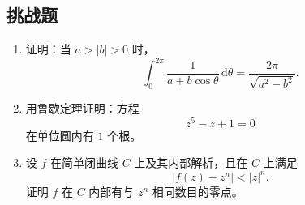 \subsection*{挑战题}

\begin{enumerate}
    \item 证明：当 $a>|b|>0$ 时，
    \[
        \int_0^{2\pi}\frac{1}{a+b\cos\theta}\,\mathrm{d}\theta
        =
        \frac{2\pi}{\sqrt{a^2-b^2}}.
    \]

    \item 用鲁歇定理证明：方程
    \[
        z^5-z+1=0
    \]
    在单位圆内有 $1$ 个根。

    \item 设 $f$ 在简单闭曲线 $C$ 上及其内部解析，且在 $C$ 上满足
    \[
        |f(z)-z^n|<|z|^n.
    \]
    证明 $f$ 在 $C$ 内部有与 $z^n$ 相同数目的零点。
\end{enumerate}
